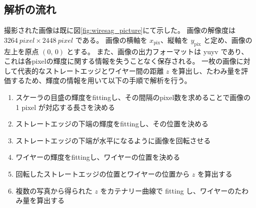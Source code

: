 \documentclass[../../main.tex]{subfiles}
\begin{document}
\subsection{解析の流れ}
撮影された画像は既に図\ref{fig:wiresag_picture}にて示した。
画像の解像度は $\SI{3264}{pixel}\times\SI{2448}{pixel}$ である。
画像の横軸を $x_{\mathrm{pix}}$、縦軸を $y_{\mathrm{pix}}$ と定め、画像の左上を原点 $(0,\,0)$ とする。
また、画像の出力フォーマットは yuyv であり、これは各pixelの輝度に関する情報を失うことなく保存される。
一枚の画像に対して代表的なストレートエッジとワイヤー間の距離 $z$ を算出し、たわみ量を評価するため、輝度の情報を用いて以下の手順で解析を行う。
\begin{enumerate}
    \item スケーラの目盛の輝度をfittingし、その間隔のpixel数を求めることで画像の 1 pixel が対応する長さを決める
    \item ストレートエッジの下端の輝度をfittingし、その位置を決める
    \item ストレートエッジの下端が水平になるように画像を回転させる
    \item ワイヤーの輝度をfittingし、ワイヤーの位置を決める
    \item 回転したストレートエッジの位置とワイヤーの位置から $z$ を算出する
    \item 複数の写真から得られた $z$ をカテナリー曲線で fitting し、ワイヤーのたわみ量を算出する
\end{enumerate}
\end{document}
